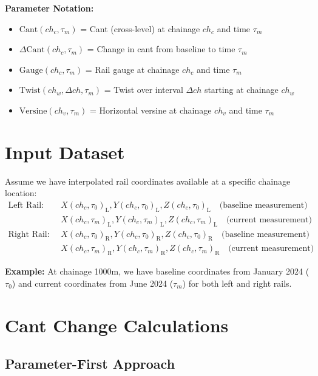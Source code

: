 \documentclass{article}
\newcommand{\chainage}[1]{ch_{#1}}
\newcommand{\Left}{\text{L}}
\newcommand{\Right}{\text{R}}
\newcommand{\X}[3]{X(#1, #2)_{#3}}
\newcommand{\Y}[3]{Y(#1, #2)_{#3}}
\newcommand{\Z}[3]{Z(#1, #2)_{#3}}
\begin{document}
\textbf{Parameter Notation:}
\begin{itemize}
\item $\text{Cant}(ch_c, \tau_m)$ = Cant (cross-level) at chainage $ch_c$ and time $\tau_m$
\item $\Delta\text{Cant}(ch_c, \tau_m)$ = Change in cant from baseline to time $\tau_m$
\item $\text{Gauge}(ch_c, \tau_m)$ = Rail gauge at chainage $ch_c$ and time $\tau_m$
\item $\text{Twist}(ch_w, \Delta ch, \tau_m)$ = Twist over interval $\Delta ch$ starting at chainage $ch_w$
\item $\text{Versine}(ch_v, \tau_m)$ = Horizontal versine at chainage $ch_v$ and time $\tau_m$
\end{itemize}

\section{Input Dataset}
Assume we have interpolated rail coordinates available at a specific chainage location:
\begin{align}
\text{Left Rail:} \quad &\X{\chainage{c}}{\tau_0}{\Left}, \Y{\chainage{c}}{\tau_0}{\Left}, \Z{\chainage{c}}{\tau_0}{\Left} \quad \text{(baseline measurement)} \\
&\X{\chainage{c}}{\tau_m}{\Left}, \Y{\chainage{c}}{\tau_m}{\Left}, \Z{\chainage{c}}{\tau_m}{\Left} \quad \text{(current measurement)} \\[0.5em]
\text{Right Rail:} \quad &\X{\chainage{c}}{\tau_0}{\Right}, \Y{\chainage{c}}{\tau_0}{\Right}, \Z{\chainage{c}}{\tau_0}{\Right} \quad \text{(baseline measurement)} \\
&\X{\chainage{c}}{\tau_m}{\Right}, \Y{\chainage{c}}{\tau_m}{\Right}, \Z{\chainage{c}}{\tau_m}{\Right} \quad \text{(current measurement)}
\end{align}

\textbf{Example:} At chainage 1000m, we have baseline coordinates from January 2024 ($\tau_0$) and current coordinates from June 2024 ($\tau_m$) for both left and right rails.

\section{Cant Change Calculations}

\subsection{Parameter-First Approach}
\end{document}
